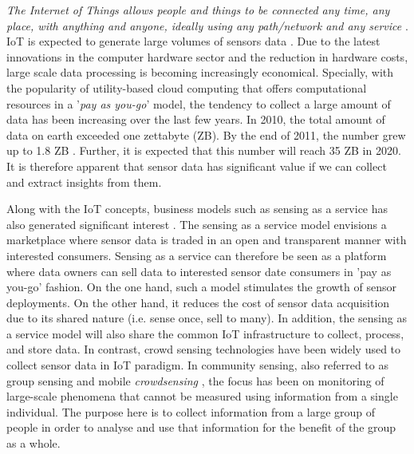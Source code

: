 \documentclass[journal]{IEEEtran}
\newcommand{\crowdsensing}{\textit{crowdsensing }}
\begin{document}
\textit{The Internet of Things allows people and things to be connected any time, any place, with anything and anyone, ideally using any path/network and any service} \cite{P029}. IoT is expected to generate large volumes of sensors data \cite{ZMP003}. Due to the latest innovations in the computer hardware sector and the reduction in  hardware costs, large scale data processing is becoming increasingly economical. Specially, with the popularity of utility-based cloud computing \cite{TCSS1} that offers computational resources in a '\textit{pay as you-go}' model, the tendency to collect a large amount of data has been increasing over the last few years. In 2010, the total amount of data on earth exceeded one zettabyte (ZB). By the end of 2011, the number grew up to 1.8 ZB \cite{ZMP003}. Further, it is expected that this number will reach 35 ZB in 2020. It is therefore apparent that sensor data has significant value if we can collect and extract insights from them.

Along with the IoT concepts, business models such as sensing as a service  has also generated significant interest \cite{ZMP008}.  The sensing as a service model  envisions a marketplace where sensor data is traded in an open and transparent manner with interested consumers. Sensing as a service can therefore  be seen as a platform where data owners can sell data to interested sensor date consumers in  'pay as you-go' fashion. On the one hand,  such a model stimulates the growth of sensor deployments. On the other hand, it reduces the cost of sensor data acquisition  due to its shared nature (i.e. sense once, sell to many). In addition, the sensing as a service model will also share the common IoT infrastructure to collect, process, and store data. In contrast, crowd sensing technologies have been widely used to collect sensor data in IoT paradigm. In community sensing, also referred to as group sensing \cite{P217} and mobile \crowdsensing \cite{crowdsensing}, the focus has been on monitoring of large-scale phenomena that cannot be measured using information from a single individual. The purpose here is to collect information from a large group of people in order to analyse and use that information for the benefit of the group  as a whole.
\end{document}
